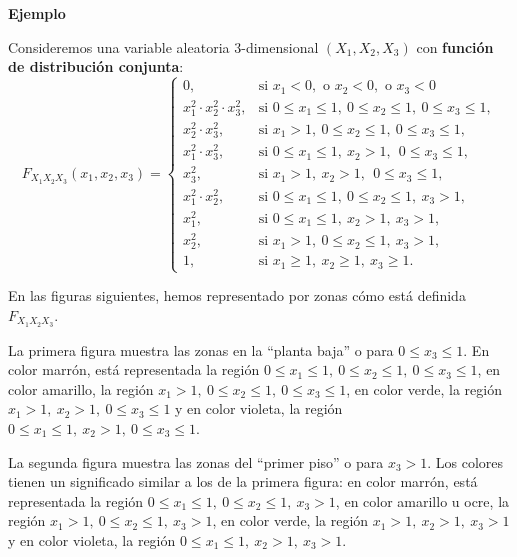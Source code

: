 \documentclass[]{book}
\begin{document}
\textbf{Ejemplo}

Consideremos una variable aleatoria \(3\)-dimensional \((X_1,X_2,X_3)\) con \textbf{función de distribución conjunta}:
\[
F_{X_1X_2X_3}(x_1,x_2,x_3)=\begin{cases}
0, & \mbox{si }x_1<0,\mbox{ o }x_2<0,\mbox{ o }x_3 <0\\
x_1^2\cdot x_2^2\cdot x_3^2, & \mbox{si }0\leq x_1\leq 1,\ 0\leq x_2\leq 1,\ 0\leq x_3\leq 1, \\
 x_2^2\cdot x_3^2, & \mbox{si }x_1> 1,\ 0\leq x_2\leq  1,\ 0\leq x_3\leq  1, \\
 x_1^2\cdot x_3^2, & \mbox{si }0\leq x_1\leq  1,\ x_2> 1,\ \ 0\leq x_3\leq  1, \\
 x_3^2, & \mbox{si }x_1> 1,\ x_2> 1,\ \ 0\leq x_3\leq  1, \\
 x_1^2\cdot x_2^2, & \mbox{si }0\leq x_1\leq  1,\ 0\leq x_2\leq  1,\ x_3> 1,\\
 x_1^2, & \mbox{si }0\leq x_1\leq  1,\ x_2 >  1,\ x_3> 1,\\
 x_2^2, & \mbox{si }x_1>1,\ 0\leq x_2\leq  1,\ x_3> 1,\\
1, & \mbox{si }x_1\geq 1,\ x_2\geq 1,\ x_3\geq 1.
\end{cases}
\]

En las figuras siguientes, hemos representado por zonas cómo está definida \(F_{X_1X_2X_3}\).

La primera figura muestra las zonas en la ``planta baja'' o para \(0\leq x_3\leq 1\).
En color marrón, está representada la región \(0\leq x_1\leq 1,\ 0\leq x_2\leq 1,\ 0\leq x_3\leq 1\), en color amarillo, la región \(x_1> 1,\ 0\leq x_2\leq 1,\ 0\leq x_3\leq 1\), en color verde, la región \(x_1>1,\ x_2>1,\ 0\leq x_3\leq 1\) y en color violeta, la región \(0\leq x_1\leq 1,\ x_2>1,\ 0\leq x_3\leq 1\).

La segunda figura muestra las zonas del ``primer piso'' o para \(x_3>1\). Los colores tienen un significado similar a los de la primera figura: en color marrón, está representada la región \(0\leq x_1\leq 1,\ 0\leq x_2\leq 1,\  x_3> 1\), en color amarillo u ocre, la región \(x_1> 1,\ 0\leq x_2\leq 1,\ x_3> 1\), en color verde, la región \(x_1>1,\ x_2>1,\ x_3> 1\) y en color violeta, la región \(0\leq x_1\leq 1,\ x_2>1,\ x_3> 1\).
\end{document}
